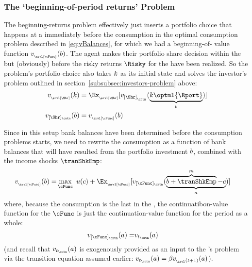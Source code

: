 \subsubsection{The `beginning-of-period returns' Problem}\label{subsubsec:beginning-returns}
The beginning-returns problem effectively just inserts a portfolio choice that happens at a {\stg} immediately before the consumption {\stg} in the optimal consumption problem described in \eqref{eq:vBalances}, for which we had a beginning-of-{\stg} value function $\vFunc_{_\arvl[\cFunc]}(\bNrm)$.  The agent makes their portfolio share decision within the {\stg} but (obviously) before the risky returns $\Risky$ for the {\interval} have been realized.  So the problem's portfolio-choice {\stg} also takes $k$ as its initial state and solves the investor's problem outlined in section~\ref{subsubsec:investors-problem} above:
\begin{equation}\begin{gathered}\begin{aligned}
  \vFunc_{_\arvl[\Shr]}(\kNrm) & = \Ex_{_\arvl[\Shr]}[\vFunc_{[\Shr]_{_\cntn}}(\underbrace{\kNrm\optml{\Rport}}_{\bNrm})]
\\ \vFunc_{[\Shr]_\cntn}(\bNrm)  & = \vFunc_{_\arvl[\cFunc]}(\bNrm)
    \end{aligned}\end{gathered}\end{equation}

Since in this setup bank balances have been determined before the consumption problems starts, we need to rewrite the consumption {\stg}  as a function of bank balances that will have resulted from the portfolio investment $b$, combined with the income shocks $\tranShkEmp$:
\begin{equation}\begin{gathered}\begin{aligned}
      \vFunc_{_\arvl[\cFunc]}(\bNrm) = & \max_{\cFunc}~ \uFunc(\cNrm) + \Ex_{_\arvl[\cFunc]}[\vFunc_{[\cFunc]_\cntn}(\underbrace{\overbrace{\bNrm+\tranShkEmp}^{\mNrm}-\cNrm}_{\aNrm})]
    \end{aligned}\end{gathered}\end{equation}
where, because the consumption {\stg} is the last {\stg} in the {\interval}, the continuatibon-value function for the $\cFunc$ {\stg} is just the continuation-value function for the period as a whole:
\begin{equation}\begin{gathered}\begin{aligned}
      \vFunc_{[\cFunc]_\cntn}(\aNrm) = & \vFunc_{\prd_\cntn}(\aNrm)
    \end{aligned}\end{gathered}\end{equation}
(and recall that $\vFunc_{\prd_\cntn}(\aNrm)$ is exogenously provided as an input to the {\interval}'s problem via the transition equation assumed earlier: $\vFunc_{\prd_\cntn}(\aNrm)=\DiscFac \vFunc_{_\arvl(\prd+1)}(a)$).

